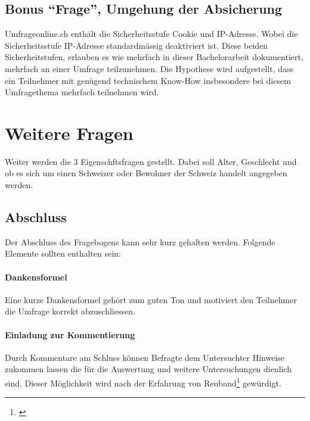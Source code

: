 \section{\texorpdfstring{Bonus ``Frage'', Umgehung der
Absicherung}{Bonus Frage, Umgehung der Absicherung}}\label{bonus-frage-umgehung-der-absicherung}

Umfrageonline.ch enthält die Sicherheitsstufe Cookie und IP-Adresse.
Wobei die Sicherheitsstufe IP-Adresse standardmässig deaktiviert ist.
Diese beiden Sicherheitstufen, erlauben es wie mehrfach in dieser
Bachelorarbeit dokumentiert, mehrfach an einer Umfrage teilzunehmen. Die
Hypothese wird aufgestellt, dass ein Teilnehmer mit genügend technischem
Know-How insbesondere bei diesem Umfragethema mehrfach teilnehmen wird.

\chapter{Weitere Fragen}\label{weitere-fragen}

Weiter werden die 3 Eigenschftsfragen gestellt. Dabei soll Alter,
Geschlecht und ob es sich um einen Schweizer oder Bewohner der Schweiz
handelt angegeben werden.

\section{Abschluss}\label{abschluss}

Der Abschluss des Fragebogens kann sehr kurz gehalten werden. Folgende
Elemente sollten enthalten sein:

\subsubsection{Dankensformel}\label{dankensformel}

Eine kurze Dankensformel gehört zum guten Ton und motiviert den
Teilnehmer die Umfrage korrekt abzuschliessen.

\subsubsection{Einladung zur
Kommentierung}\label{einladung-zur-kommentierung}

Durch Kommentare am Schluss können Befragte dem Untersuchter Hinweise
zukommen lassen die für die Auswertung und weitere Untersuchungen
dienlich sind. Dieser Möglichkeit wird nach der Erfahrung von
Reuband\footnote{\autocite{kzfss01}} gewürdigt.

